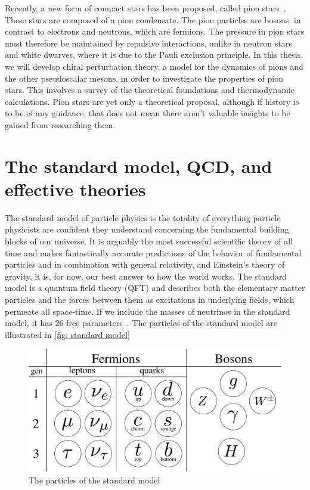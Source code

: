 Recently, a new form of compact stars has been proposed, called pion stars~\autocite{andersenBoseEinsteinCondensationPion2018,brandtNewClassCompact2018,carignanoScrutinizingPionCondensed2017}.
These stars are composed of a pion condensate.
The pion particles are bosons, in contrast to electrons and neutrons, which are fermions.
The pressure in pion stars must therefore be maintained by repulsive interactions, unlike in neutron stars and white dwarves, where it is due to the Pauli exclusion principle.
In this thesis, we will develop chiral perturbation theory, a model for the dynamics of pions and the other pseudoscalar mesons, in order to investigate the properties of pion stars.
This involves a survey of the theoretical foundations and thermodynamic calculations.
Pion stars are yet only a theoretical proposal, although if history is to be of any guidance, that does not mean there aren't valuable insights to be gained from researching them.




\section{The standard model, QCD, and effective theories}


The standard model of particle physics is the totality of everything particle physicists are confident they understand concerning the fundamental building blocks of our universe.
It is arguably the most successful scientific theory of all time and makes fantastically accurate predictions of the behavior of fundamental particles and
in combination with general relativity, and Einstein's theory of gravity, it is, for now, our best answer to how the world works.
The standard model is a quantum field theory (QFT) and describes both the elementary matter particles and the forces between them as excitations in underlying fields, which permeate all space-time.
If we include the masses of neutrinos in the standard model, it has 26 free parameters~\autocite{kramerStandardModelParticle2017}.
The particles of the standard model are illustrated in \autoref{fig: standard model}~\autocite{griffithsIntroductionElementaryParticles2008,schwartzQuantumFieldTheory2013}


\begin{figure}[!htb]
    \centering
    \includegraphics[width=.75\textwidth]{figurer/standard_model.pdf}
    \caption{The particles of the standard model}
    \label{fig: standard model}
\end{figure}




